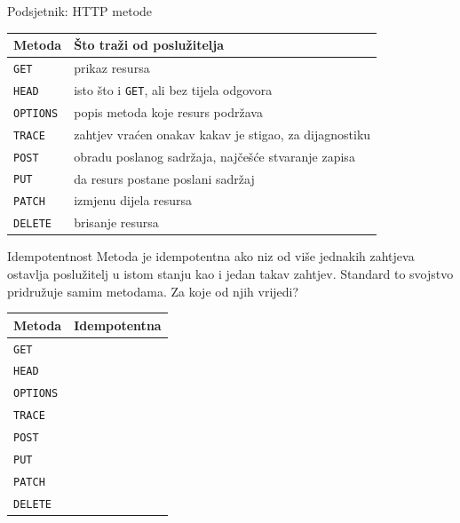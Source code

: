 \begin{frame}{Podsjetnik: HTTP metode}
\vspace{0.3em}
\begin{center}
{\small
\setlength{\tabcolsep}{10pt}
\renewcommand{\arraystretch}{1.1}
\begin{tabular}{@{}lL{7.6cm}@{}}
  \toprule
  \textbf{Metoda} & \textbf{Što traži od poslužitelja} \\
  \midrule
  \texttt{GET}     & prikaz resursa \\
  \texttt{HEAD}    & isto što i \texttt{GET}, ali bez tijela odgovora \\
  \texttt{OPTIONS} & popis metoda koje resurs podržava \\
  \texttt{TRACE}   & zahtjev vraćen onakav kakav je stigao, za dijagnostiku \\
  \texttt{POST}    & obradu poslanog sadržaja, najčešće stvaranje zapisa \\
  \texttt{PUT}     & da resurs postane poslani sadržaj \\
  \texttt{PATCH}   & izmjenu dijela resursa \\
  \texttt{DELETE}  & brisanje resursa \\
  \bottomrule
\end{tabular}
}
\end{center}

\end{frame}

\begin{frame}{Idempotentnost}
Metoda je idempotentna ako niz od više jednakih zahtjeva ostavlja poslužitelj u istom stanju kao i jedan takav zahtjev. Standard to svojstvo pridružuje samim metodama. Za koje od njih vrijedi?

\vspace{0.6em}
\begin{center}
{\small
\setlength{\tabcolsep}{14pt}
\renewcommand{\arraystretch}{1.15}
\begin{tabular}{@{}ll@{}}
  \toprule
  \textbf{Metoda} & \textbf{Idempotentna} \\
  \midrule
  \texttt{GET}     & \\
  \texttt{HEAD}    & \\
  \texttt{OPTIONS} & \\
  \texttt{TRACE}   & \\
  \texttt{POST}    & \\
  \texttt{PUT}     & \\
  \texttt{PATCH}   & \\
  \texttt{DELETE}  & \\
  \bottomrule
\end{tabular}
}
\end{center}
\end{frame}

